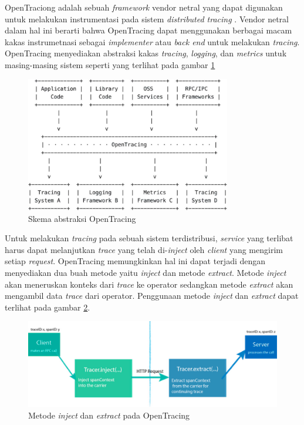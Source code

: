 OpenTraciong adalah sebuah \textit{framework} vendor netral yang dapat digunakan untuk melakukan instrumentasi pada sistem \textit{distributed tracing} \citep{opentracing}. Vendor netral dalam hal ini berarti bahwa OpenTracing dapat menggunakan berbagai macam kakas instrumetnasi sebagai \textit{implementer} atau \textit{back end} untuk melakukan \textit{tracing}. OpenTracing menyediakan abstraksi kakas \textit{tracing}, \textit{logging}, dan \textit{metrics} untuk masing-masing sistem seperti yang terlihat pada gambar \ref{ch2-opentracing-1}
\begin{figure}[htb]
	\centering
	\includegraphics[width=0.8\textwidth]{resources/ch2/ch2-opentracing.png}
	\caption{Skema abstraksi OpenTracing \citep{opentracing}}
	\label{ch2-opentracing-1}
\end{figure}

Untuk melakukan \textit{tracing} pada sebuah sistem terdistribusi, \textit{service} yang terlibat harus dapat melanjutkan \textit{trace} yang telah di-\textit{inject} oleh \textit{client} yang mengirim setiap \textit{request}. OpenTracing memungkinkan hal ini dapat terjadi dengan menyediakan dua buah metode yaitu \textit{inject} dan metode \textit{extract}. Metode \textit{inject} akan meneruskan konteks dari \textit{trace} ke operator sedangkan metode \textit{extract} akan mengambil data \textit{trace} dari operator. Penggunaan metode \textit{inject} dan \textit{extract} dapat terlihat pada gambar \ref{ch2-opentracing-2}.
\begin{figure}[htb]
	\centering
	\includegraphics[width=1\textwidth]{resources/ch2/inject-extract.png}
	\caption{Metode \textit{inject} dan \textit{extract} pada OpenTracing \citep{opentracing}}
	\label{ch2-opentracing-2}
\end{figure}


